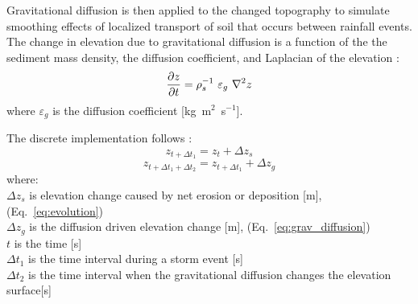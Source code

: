 \documentclass[gmd, manuscript]{copernicus}
\begin{document}
\noindent
Gravitational diffusion is then applied to the changed topography 
to simulate smoothing effects of localized transport of soil that
occurs between rainfall events.
The change in elevation due to gravitational diffusion
is a function of the the sediment mass density,
the diffusion coefficient, and Laplacian of the elevation
\citep{Thaxton2004}:
\begin{equation}
\label{eq:grav_diffusion} 
{\partial z \over \partial t } = \rho_s^{-1} ~ \varepsilon_g ~ \nabla^2 z 
\end{equation}
\noindent
where $\varepsilon_g$ is the diffusion coefficient [\unit{kg~m}$^{2}$~\unit{s}$^{-1}$].

The discrete implementation follows \cite{Thaxton2004}:
\begin{equation}
\label{eq:evolution_disc1} 
z_{t+ \Delta t_1} = z_t + \Delta z_s  
\end{equation}
\begin{equation}
\label{eq:evolution_disc2} 
z_{t+\Delta t_1+\Delta t_2} = z_{t+\Delta t_1} + \Delta z_g 
\end{equation}
{\small
where: \\
\noindent
\hspace*{0.5em} $\Delta z_s$ is elevation change caused by net erosion or deposition [\unit{m}], (Eq.~\ref{eq:evolution})\\
\hspace*{0.5em} $\Delta z_g$ is the diffusion driven elevation change [\unit{m}], (Eq.~\ref{eq:grav_diffusion})\\
\hspace*{0.5em} $t$ is the time [\unit{s}] \\
\hspace*{0.5em} $\Delta t_1$ is the time interval during a storm event [\unit{s}] \\
\hspace*{0.5em} $\Delta t_2$ is the time interval when the gravitational diffusion changes the elevation surface[\unit{s}] \\
}
\end{document}
